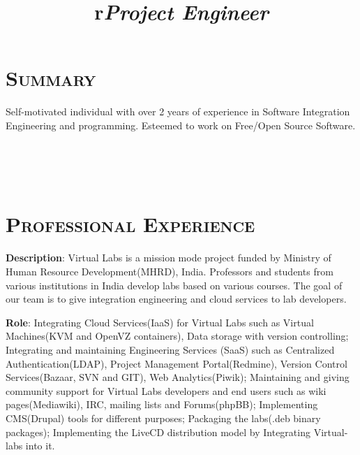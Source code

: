 \begin{resume}




\section{\textsc{Summary}}
Self-motivated individual with over 2 years of experience in Software
Integration Engineering and programming. Esteemed to work on Free/Open
Source Software.
 

\begin{formatb}
  \title{r}\\
  \\
  \body\\
\end{formatb}

\section{\textsc{Professional Experience}}
\title{\em \textbf{Project Engineer}}
\begin{position}
\textbf{Description}: Virtual Labs is a mission mode project funded by
Ministry of Human Resource Development(MHRD), India. Professors and
students from various institutions in India develop labs based on
various courses. The goal of our team is to give integration
engineering and cloud services to lab developers.

\textbf{Role}: Integrating Cloud Services(IaaS) for Virtual Labs such
as Virtual Machines(KVM and OpenVZ containers), Data storage with
version controlling; Integrating and maintaining Engineering Services
(SaaS) such as Centralized Authentication(LDAP), Project Management
Portal(Redmine), Version Control Services(Bazaar, SVN and GIT), Web
Analytics(Piwik); Maintaining and giving community support for Virtual
Labs developers and end users such as wiki pages(Mediawiki), IRC,
mailing lists and Forums(phpBB); Implementing CMS(Drupal) tools for
different purposes; Packaging the labs(.deb binary packages);
Implementing the LiveCD distribution model by Integrating Virtual-labs
into it.


\end{position}
\end{resume}
